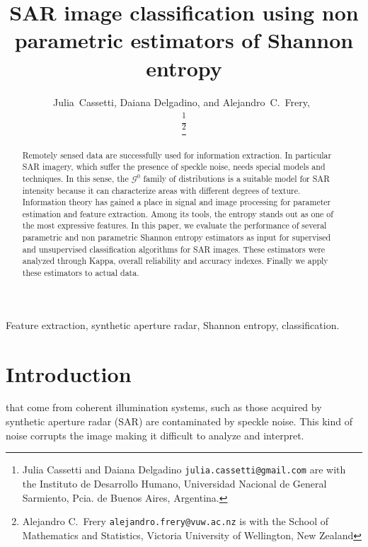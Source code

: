 \documentclass[journal]{IEEEtran}
\begin{document}
\title{SAR image classification using non parametric estimators of Shannon entropy}
\author{ Julia~Cassetti, Daiana Delgadino, and Alejandro~C.~Frery,~


\thanks{Julia Cassetti and Daiana Delgadino \texttt{julia.cassetti@gmail.com} are with the  Instituto de Desarrollo Humano, Universidad Nacional de General Sarmiento, Pcia. de Buenos Aires, Argentina.}

\thanks{Alejandro C.\ Frery \texttt{alejandro.frery@vuw.ac.nz} is with the School of Mathematics and Statistics, Victoria University of Wellington, New Zealand} 
}

\maketitle

\begin{abstract}
	
Remotely sensed data are successfully used for information extraction. 
In particular SAR imagery, which suffer the presence of speckle noise, needs special models and techniques. 
In this sense, the $\mathcal G^0$ family of distributions is a suitable model for SAR intensity because it can characterize areas with different degrees of texture. 
Information theory has gained a place in signal and image processing for parameter estimation and feature extraction.
Among its tools, the entropy stands out as one of the most expressive features.
In this paper, we evaluate the performance of several parametric and non parametric Shannon entropy estimators as input for supervised and unsupervised classification algorithms for SAR images.
These estimators were analyzed through Kappa, overall reliability and accuracy indexes. 
Finally we apply these estimators to actual data.

\end{abstract}

\begin{keywords}
Feature extraction, synthetic aperture radar, Shannon entropy, classification.
\end{keywords}

\IEEEpeerreviewmaketitle

\section{Introduction}
\label{intro}
 that come from coherent illumination systems, such as those acquired by synthetic aperture radar (SAR) are contaminated by speckle noise. 
This kind of noise corrupts the image making it difficult to analyze and interpret. 
\end{document}
